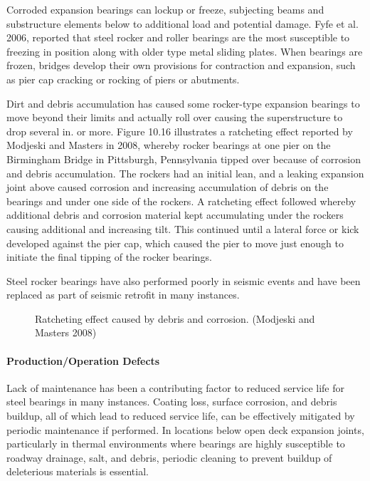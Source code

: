 Corroded expansion bearings can lockup or freeze, subjecting beams and substructure elements below to
additional load and potential damage. Fyfe et al. 2006, reported that steel rocker and roller bearings are the most
susceptible to freezing in position along with older type metal sliding plates. When bearings are frozen, bridges
develop their own provisions for contraction and expansion, such as pier cap cracking or rocking of piers or
abutments.

Dirt and debris accumulation has caused some rocker-type expansion bearings to move beyond their limits and
actually roll over causing the superstructure to drop several in. or more. Figure 10.16 illustrates a ratcheting effect
reported by Modjeski and Masters in 2008, whereby rocker bearings at one pier on the Birmingham Bridge in Pittsburgh, Pennsylvania tipped over because of corrosion and debris accumulation. The rockers had an initial lean,
and a leaking expansion joint above caused corrosion and increasing accumulation of debris on the bearings and
under one side of the rockers. A ratcheting effect followed whereby additional debris and corrosion material kept
accumulating under the rockers causing additional and increasing tilt. This continued until a lateral force or kick
developed against the pier cap, which caused the pier to move just enough to initiate the final tipping of the rocker
bearings.

Steel rocker bearings have also performed poorly in seismic events and have been replaced as part of seismic
retrofit in many instances.

\begin{figure}
  \caption{Ratcheting effect caused by debris and corrosion. (Modjeski and Masters 2008)}\label{fig:ratchet-debris-corrosion}
\end{figure}

\paragraph{Production/Operation Defects}
Lack of maintenance has been a contributing factor to reduced service life for steel bearings in many instances.
Coating loss, surface corrosion, and debris buildup, all of which lead to reduced service life, can be effectively
mitigated by periodic maintenance if performed. In locations below open deck expansion joints, particularly in
thermal environments where bearings are highly susceptible to roadway drainage, salt, and debris, periodic cleaning
to prevent buildup of deleterious materials is essential.

